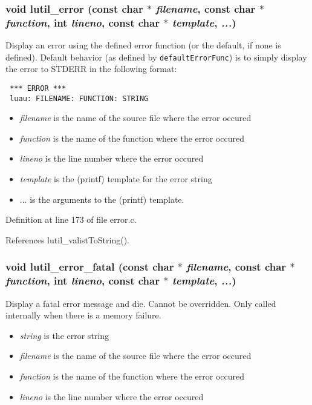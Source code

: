 \subsubsection{\setlength{\rightskip}{0pt plus 5cm}void lutil\_\-error (const char $\ast$ {\em filename}, const char $\ast$ {\em function}, int {\em lineno}, const char $\ast$ {\em template},  {\em ...})}\label{error_8c_a7}


Display an error using the defined error function (or the default, if none is defined). Default behavior (as defined by {\tt default\-Error\-Func}) is to simply display the error to STDERR in the following format:



\footnotesize\begin{verbatim} *** ERROR ***
 luau: FILENAME: FUNCTION: STRING
\end{verbatim}
\normalsize


\begin{itemize}
\item {\em filename\/} is the name of the source file where the error occured \item {\em function\/} is the name of the function where the error occured \item {\em lineno\/} is the line number where the error occured \item {\em template\/} is the (printf) template for the error string \item {\em \/}... is the arguments to the (printf) template. \end{itemize}


Definition at line 173 of file error.c.

References lutil\_\-valist\-To\-String().
\subsubsection{\setlength{\rightskip}{0pt plus 5cm}void lutil\_\-error\_\-fatal (const char $\ast$ {\em filename}, const char $\ast$ {\em function}, int {\em lineno}, const char $\ast$ {\em template},  {\em ...})}\label{error_8c_a5}


Display a fatal error message and die. Cannot be overridden. Only called internally when there is a memory failure.

\begin{itemize}
\item {\em string\/} is the error string \item {\em filename\/} is the name of the source file where the error occured \item {\em function\/} is the name of the function where the error occured \item {\em lineno\/} is the line number where the error occured 
\end{itemize}


